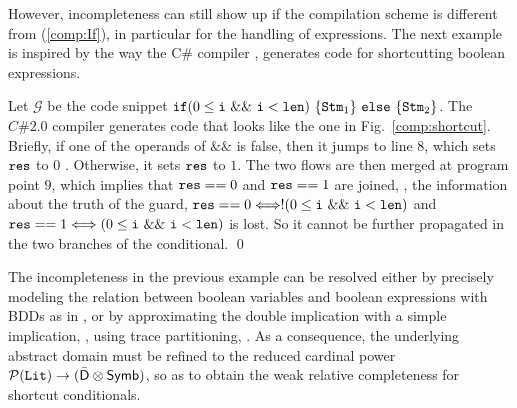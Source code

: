 \documentclass{llncs}
\begin{document}
However, incompleteness can still show up if the compilation scheme is different from  (\ref{comp:If}), in particular for the handling of expressions.
The next example is inspired by the way the C\# compiler \cite{VisualCSharp}, generates code for shortcutting boolean expressions.

\begin{example}
Let $\mathcal{G}$ be the code snippet $\If (0 \leq \code{i}\ \&\&\ \code{i} < \code{len})\ \{ \Stm_1 \}\ \Else\ \{ \Stm_2 \}$.
The $C\# 2.0$ compiler generates code that looks like the one in Fig.~\ref{comp:shortcut}.
Briefly, if one of  the operands of $\&\&$ is false, then it jumps to line $8$, which sets  $\mathtt{res}$ to $0$ .
Otherwise, it sets $\mathtt{res}$ to $1$.
The two flows are then merged at program point $9$, which implies that $\mathtt{res} == 0$ and $\mathtt{res} == 1$ are joined, \ie, the information about the truth of the guard, $\result == 0 \Longleftrightarrow !(0 \leq \code{i}\ \&\&\ \code{i} < \code{len})$ and $\result == 1 \Longleftrightarrow (0 \leq \code{i}\ \&\&\ \code{i} < \code{len})$ is lost.
So it cannot be further propagated in the two branches of the conditional. \qed
\end{example}
The incompleteness in the previous example can be resolved either by precisely modeling the relation between boolean variables and boolean expressions with BDDs as in \cite{Jeannet02}, or by approximating the double implication with a simple implication, \eg, using trace partitioning, \cite{Tzolovski98}.
As a consequence, the underlying abstract domain must be refined to the reduced cardinal power $\mathcal{P}{(\mathtt{Lit})} \rightarrow (\bar{\mathsf{D}} \otimes \mathsf{Symb})$, so as to obtain the weak relative completeness for shortcut conditionals.
\end{document}
